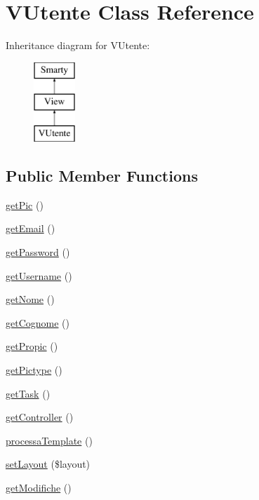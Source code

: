 \hypertarget{class_v_utente}{}\section{V\+Utente Class Reference}
\label{class_v_utente}
Inheritance diagram for V\+Utente\+:\begin{figure}[H]
\begin{center}
\leavevmode
\includegraphics[height=3.000000cm]{class_v_utente}
\end{center}
\end{figure}
\subsection*{Public Member Functions}
\begin{DoxyCompactItemize}
\item 
\mbox{\hyperlink{class_v_utente_a218c2a53843b2af2e9b28c40d67b5914}{get\+Pic}} ()
\item 
\mbox{\hyperlink{class_v_utente_a02a01849f28e2535e888ae4ec87b20f2}{get\+Email}} ()
\item 
\mbox{\hyperlink{class_v_utente_a04e0957baeb7acde9c0c86556da2d43f}{get\+Password}} ()
\item 
\mbox{\hyperlink{class_v_utente_a81b37a3c9d639574e394f80c1138c75e}{get\+Username}} ()
\item 
\mbox{\hyperlink{class_v_utente_a67fa74a47af3f2f9eeced7c37c2ef0d3}{get\+Nome}} ()
\item 
\mbox{\hyperlink{class_v_utente_aa114419de31d6dd2151842ea68f84283}{get\+Cognome}} ()
\item 
\mbox{\hyperlink{class_v_utente_afb77cb35ab7e2fba8cb983fbbbb8bfd8}{get\+Propic}} ()
\item 
\mbox{\hyperlink{class_v_utente_ad7692598156e778e9c744ed7b32877fd}{get\+Pictype}} ()
\item 
\mbox{\hyperlink{class_v_utente_a13871c4434338f02d6f8d430fa0597f2}{get\+Task}} ()
\item 
\mbox{\hyperlink{class_v_utente_aa8b89e0bad51878addc1300cd3e95b5c}{get\+Controller}} ()
\item 
\mbox{\hyperlink{class_v_utente_a64bdc484fc7074989b4b2c0ebc63aec2}{processa\+Template}} ()
\item 
\mbox{\hyperlink{class_v_utente_a702b3376618a26e6c02c05bae65c6b9e}{set\+Layout}} (\$layout)
\item 
\mbox{\hyperlink{class_v_utente_ad153372cfab6f86800a89b5a378d9760}{get\+Modifiche}} ()
\end{DoxyCompactItemize}
